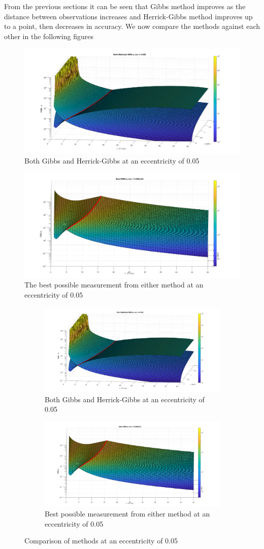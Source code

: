 \documentclass[12pt]{article}
\begin{document}
	From the previous sections it can be seen  that Gibbs method improves as the distance between observations increases and Herrick-Gibbs method improves up to a point, then decreases in accuracy. We now compare the methods against each other in the following figures 
	\begin{figure}[H]
		\centering
		\includegraphics[width=0.7\linewidth]{bothMethods_e_05}
		\caption{Both Gibbs and Herrick-Gibbs at an eccentricity of 0.05}
		\label{fig:bothmethodse05}
	\end{figure}
	\begin{figure}[H]
		\centering
		\includegraphics[width=0.7\linewidth]{bestMethods_e_05}
		\caption{The best possible measurement from either method at an eccentricity of 0.05}
		\label{fig:bestmethodse05}
	\end{figure}

\begin{figure}[H]
	\centering
	\begin{subfigure}{.5\textwidth}
		\centering
		\includegraphics[width=.4\linewidth]{bothMethods_e_05}
		\caption{Both Gibbs and Herrick-Gibbs at an eccentricity of 0.05}
		\label{fig:sub1}
	\end{subfigure}%
	\begin{subfigure}{.5\textwidth}
		\centering
		\includegraphics[width=.4\linewidth]{bestMethods_e_05}
		\caption{Best possible measurement from either method at an eccentricity of 0.05}
		\label{fig:sub2}
	\end{subfigure}
	\caption{Comparison of methods at an eccentricity of 0.05}
	\label{fig:test}
\end{figure}
\end{document}
